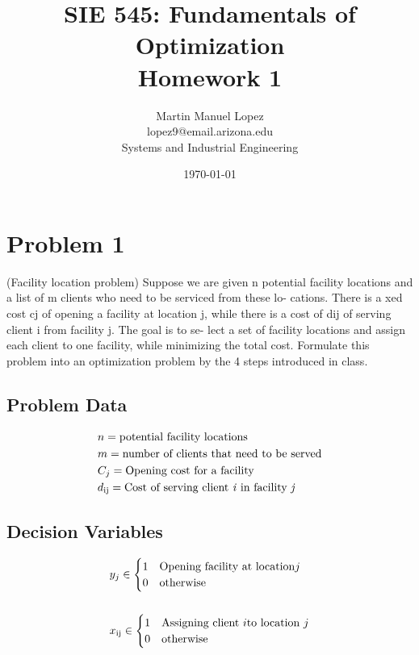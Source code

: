 \documentclass[12pt]{article}
\begin{document}
\title{SIE 545: Fundamentals of Optimization \\Homework 1}
\author{Martin Manuel Lopez \\lopez9@email.arizona.edu \\Systems and Industrial Engineering}
\date{\today}
\maketitle
\section{Problem 1}   
(Facility location problem) Suppose we are given n potential facility
locations and a list of m clients who need to be serviced from these lo-
cations. There is a xed cost cj of opening a facility at location j, while
there is a cost of dij of serving client i from facility j. The goal is to se-
lect a set of facility locations and assign each client to one facility, while
minimizing the total cost. Formulate this problem into an optimization
problem by the 4 steps introduced in class.

\subsection{Problem Data}
    \begin{equation*}
        \begin{split}
            &n  = \text{potential facility locations}\\
            &m  = \text{number of clients that need to be served}\\
            &C_j  = \text{Opening cost for a facility}\\
            &d\textsubscript{ij} = \text{Cost of serving client \textit{i} in facility \textit{j}}\\  
        \end{split}
    \end{equation*}
\subsection{Decision Variables}
    \begin{align*}
        &y_j \in 
            \begin{cases} 
                1 & \text{Opening facility at location} j\\
                0 & \text{otherwise}\\
            \end{cases}
        \\ %
        \\
        &x\textsubscript{ij} \in
            \begin{cases}
                1 & \text{Assigning client } i \text{to location } j\\
                0 & \text{otherwise}\\
            \end{cases}
    \end{align*}
\end{document}
